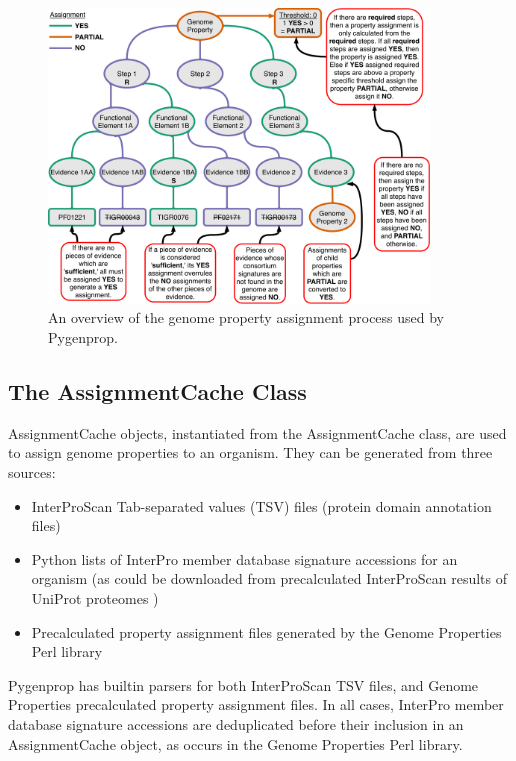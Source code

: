 \begin{figure}[!ht]
  \centering
	\includegraphics[width=0.90\textwidth]{media/Pygenprop_Assignment.pdf}
	 \caption{An overview of the genome property assignment process used by Pygenprop.}
	 \label{fig:propertyassignment}
\end{figure}

\subsection{The AssignmentCache Class} \label{AssignmentCache}

AssignmentCache objects, instantiated from the AssignmentCache class, are used to assign genome properties to an organism. They can be generated from three sources: 
\begin{itemize}
\item InterProScan Tab-separated values (TSV) files (protein domain annotation files) 
\item Python lists of InterPro member database signature accessions for an organism (as could be downloaded from precalculated InterProScan results of UniProt proteomes \cite{uniprot2014uniprot})
\item Precalculated property assignment files generated by the Genome Properties Perl library
\end{itemize}
Pygenprop has builtin parsers for both InterProScan TSV files, and Genome Properties precalculated property assignment files. In all cases, InterPro member database signature accessions are deduplicated before their inclusion in an AssignmentCache object, as occurs in the Genome Properties Perl library.

